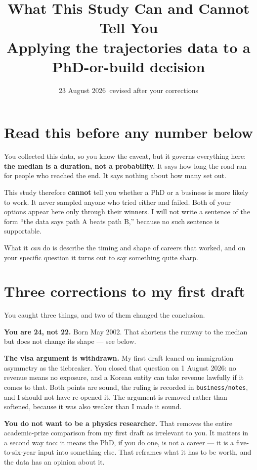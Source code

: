 \documentclass[11pt]{article}
\title{\bfseries What This Study Can and Cannot Tell You\\[0.35em]
\large Applying the trajectories data to a PhD-or-build decision}
\date{\normalsize 23 August 2026 \quad$\cdot$\quad revised after your corrections}
\begin{document}
\maketitle

\section*{Read this before any number below}

You collected this data, so you know the caveat, but it governs everything here:
\textbf{the median is a duration, not a probability.} It says how long the road
ran for people who reached the end. It says nothing about how many set out.

This study therefore \textbf{cannot} tell you whether a PhD or a business is
more likely to work. It never sampled anyone who tried either and failed. Both
of your options appear here only through their winners. I will not write a
sentence of the form ``the data says path A beats path B,'' because no such
sentence is supportable.

What it \emph{can} do is describe the timing and shape of careers that worked,
and on your specific question it turns out to say something quite sharp.

\section{Three corrections to my first draft}

You caught three things, and two of them changed the conclusion.

\textbf{You are 24, not 22.} Born May 2002. That shortens the runway to the
median but does not change its shape --- see below.

\textbf{The visa argument is withdrawn.} My first draft leaned on immigration
asymmetry as the tiebreaker. You closed that question on 1 August 2026: no
revenue means no exposure, and a Korean entity can take revenue lawfully if it
comes to that. Both points are sound, the ruling is recorded in
\texttt{business/notes}, and I should not have re-opened it. The argument is
removed rather than softened, because it was also weaker than I made it sound.

\textbf{You do not want to be a physics researcher.} That removes the entire
academic-prize comparison from my first draft as irrelevant to you. It matters
in a second way too: it means the PhD, if you do one, is not a career --- it is
a five-to-six-year input into something else. That reframes what it has to be
worth, and the data has an opinion about it.
\end{document}
